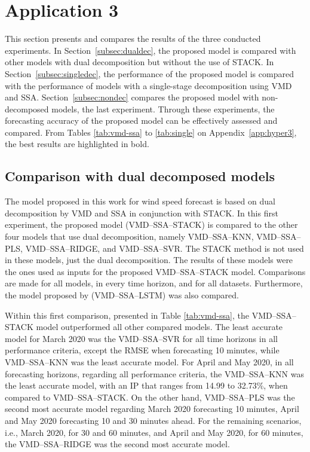 \section{Application 3} \label{sec:case_study3}

This section presents and compares the results of the three conducted experiments. In Section~\ref{subsec:dualdec}, the proposed model is compared with other models with dual decomposition but without the use of \ac{STACK}. In Section~\ref{subsec:singledec}, the performance of the proposed model is compared with the performance of models with a single-stage decomposition using \ac{VMD} and \ac{SSA}. Section~\ref{subsec:nondec} compares the proposed model with non-decomposed models, the last experiment. Through these experiments, the forecasting accuracy of the proposed model can be effectively assessed and compared. From Tables \ref{tab:vmd-ssa} to \ref{tab:single} on Appendix~\ref{app:hyper3}, the best results are highlighted in bold.

\subsection{Comparison with dual decomposed models \label{subsec:dualdec}}

The model proposed in this work for wind speed forecast is based on dual decomposition by \ac{VMD} and \ac{SSA} in conjunction with \ac{STACK}. In this first experiment, the proposed model (\ac{VMD}--\ac{SSA}--\ac{STACK}) is compared to the other four models that use dual decomposition, namely \ac{VMD}--\ac{SSA}--\ac{KNN}, \ac{VMD}--\ac{SSA}--\ac{PLS}, \ac{VMD}--\ac{SSA}--\ac{RIDGE}, and \ac{VMD}--\ac{SSA}--\ac{SVR}. The \ac{STACK} method is not used in these models, just the dual decomposition. The results of these models were the ones used as inputs for the proposed \ac{VMD}--\ac{SSA}--\ac{STACK} model. Comparisons are made for all models, in every time horizon, and for all datasets. Furthermore, the model proposed by  (\ac{VMD}--\ac{SSA}--LSTM) was also compared.

Within this first comparison, presented in Table \ref{tab:vmd-ssa}, the \ac{VMD}--\ac{SSA}--\ac{STACK} model outperformed all other compared models. The least accurate model for March 2020 was the \ac{VMD}--\ac{SSA}--\ac{SVR} for all time horizons in all performance criteria, except the \ac{RMSE} when forecasting 10 minutes, while \ac{VMD}--\ac{SSA}--\ac{KNN} was the least accurate model. For April and May 2020, in all forecasting horizons, regarding all performance criteria, the \ac{VMD}--\ac{SSA}--\ac{KNN} was the least accurate model, with an \ac{IP} that ranges from 14.99 to 32.73\%, when compared to \ac{VMD}--\ac{SSA}--\ac{STACK}. On the other hand, \ac{VMD}--\ac{SSA}--\ac{PLS} was the second most accurate model regarding March 2020 forecasting 10 minutes, April and May 2020 forecasting 10 and 30 minutes ahead. For the remaining scenarios, i.e., March 2020, for 30 and 60 minutes, and April and May 2020, for 60 minutes, the \ac{VMD}--\ac{SSA}--\ac{RIDGE} was the second most accurate model.

